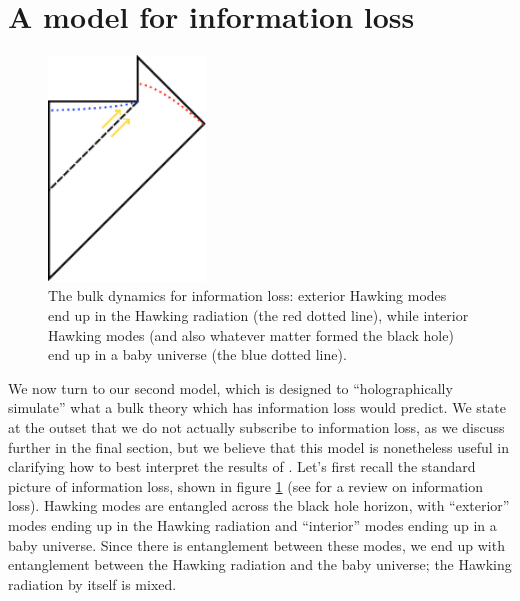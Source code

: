\documentclass[12pt]{article}
\newcommand{\bfig}{\begin{figure}\begin{center}}
\newcommand{\efig}{\end{center}\end{figure}}
\theoremstyle{definition}
\begin{document}
\section{A model for information loss}
\bfig
\includegraphics[height=6cm]{infoloss.pdf}
\caption{The bulk dynamics for information loss: exterior Hawking modes end up in the Hawking radiation (the red dotted line), while interior Hawking modes (and also whatever matter formed the black hole) end up in a baby universe (the blue dotted line).}\label{infoloss}
\efig
We now turn to our second model, which is designed to ``holographically simulate'' what a bulk theory which has information loss would predict.  We state at the outset that we do not actually subscribe to information loss, as we discuss further in the final section, but we believe that this model is nonetheless useful in clarifying how to best interpret the results of \cite{Almheiri:2019psf,Penington:2019npb,Almheiri:2019hni}.  Let's first recall the standard picture of information loss, shown in figure \ref{infoloss} (see \cite{Unruh:2017uaw} for a review on information loss).  Hawking modes are entangled across the black hole horizon, with ``exterior'' modes ending up in the Hawking radiation and ``interior'' modes ending up in a baby universe.  Since there is entanglement between these modes, we end up with entanglement between the Hawking radiation and the baby universe; the Hawking radiation by itself is mixed.  
\end{document}

